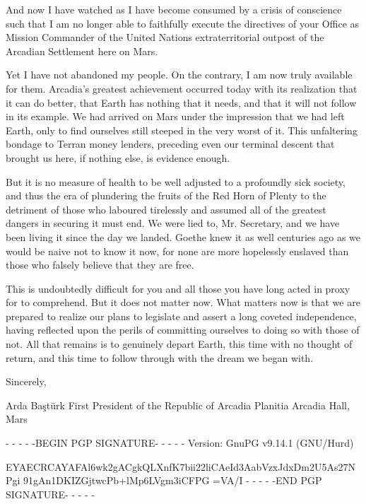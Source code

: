 And now I have watched as I have become consumed by a crisis of conscience such that I am no longer able to faithfully execute the directives of your Office as Mission Commander of the United Nations extraterritorial outpost of the Arcadian Settlement here on Mars.

Yet I have not abandoned my people. On the contrary, I am now truly available for them. Arcadia's greatest achievement occurred today with its realization that it can do better, that Earth has nothing that it needs, and that it will not follow in its example. We had arrived on Mars under the impression that we had left Earth, only to find ourselves still steeped in the very worst of it. This unfaltering bondage to Terran money lenders, preceding even our terminal descent that brought us here, if nothing else, is evidence enough.

But it is no measure of health to be well adjusted to a profoundly sick society, and thus the era of plundering the fruits of the Red Horn of Plenty to the detriment of those who laboured tirelessly and assumed all of the greatest dangers in securing it must end. We were lied to, Mr. Secretary, and we have been living it since the day we landed. Goethe knew it as well centuries ago as we would be naive not to know it now, for none are more hopelessly enslaved than those who falsely believe that they are free.

This is undoubtedly difficult for you and all those you have long acted in proxy for to comprehend. But it does not matter now. What matters now is that we are prepared to realize our plans to legislate and assert a long coveted independence, having reflected upon the perils of committing ourselves to doing so with those of not. All that remains is to genuinely depart Earth, this time with no thought of return, and this time to follow through with the dream we began with.

Sincerely, 

\hskip 1.5cm 
   
Arda Baştürk
First President of the Republic of Arcadia Planitia
Arcadia Hall, Mars

- - - - -BEGIN PGP SIGNATURE- - - - -
Version: GnuPG v9.14.1 (GNU/Hurd)

EYAECRCAYAFAl6wk2gACgkQLXnfK7bii22liCAeId3AabVzxJdxDm2U5As27NPgi
91gAn1DKIZGjtwcPb+lMp6LVgm3iCFPG
=VA/I
- - - - -END PGP SIGNATURE- - - - -
\stoplines

